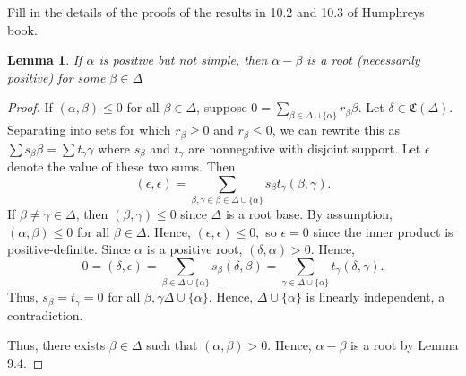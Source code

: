 \documentclass{article}
\newcommand{\mf}{\mathfrak}
\newtheorem{lem}[thm]{Lemma}
\begin{document}
\p Fill in the details of the proofs of the results in 10.2 and 10.3 of Humphreys book.

\begin{lem} If $\alpha$ is positive but not simple, then $\alpha - \beta$ is a root 
(necessarily positive) for some $\beta \in \Delta$
\end{lem}
\begin{proof}
If $(\alpha, \beta) \le 0$ for all $\beta \in \Delta$, suppose
$0 = \sum_{\beta \in \Delta \cup \{ \alpha \}} r_\beta \beta$. Let $\delta \in \mf{C}(\Delta)$.
 Separating into sets for which $r_\beta \ge 0$ and $r_\beta \le 0$, we can rewrite this as
$\sum s_\beta \beta = \sum t_\gamma \gamma$ where $s_\beta$ and $t_\gamma$
are nonnegative with disjoint support.  Let $\epsilon$ denote the value
of these two sums.  Then
$$(\epsilon, \epsilon) = \sum_{\beta, \gamma \in \beta \in \Delta \cup \{ \alpha \}} s_\beta t_\gamma (\beta, \gamma).$$
If $\beta \neq \gamma \in \Delta$, then $(\beta, \gamma) \le 0$ since $\Delta$ is a root base. By assumption,
$(\alpha, \beta) \le 0$ for all $\beta \in \Delta$.  Hence, 
$(\epsilon, \epsilon) \le 0,$
so $\epsilon = 0$ since the inner product is positive-definite.  
Since $\alpha$ is a positive root, $(\delta, \alpha) > 0$.  Hence,
$$0 = (\delta, \epsilon) = \sum_{\beta \in \Delta \cup \{ \alpha \}} s_\beta (\delta, \beta) = \sum_{\gamma \in \Delta \cup \{ \alpha \}} t_\gamma (\delta, \gamma).$$
Thus, $s_\beta = t_\gamma = 0$ for all $\beta, \gamma \Delta \cup \{ \alpha \}$.  Hence, $\Delta \cup \{ \alpha \}$ is linearly independent, a contradiction.

Thus, there exists $\beta \in \Delta$ such that $(\alpha, \beta) > 0$.  Hence, $\alpha - \beta$ is a root by Lemma 9.4.
\end{proof}
\end{document}

